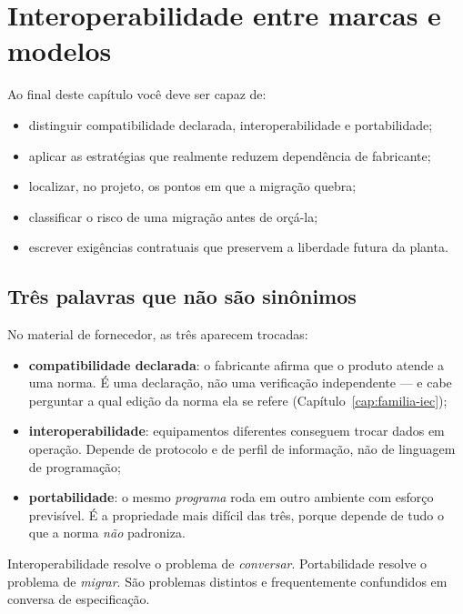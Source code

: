 \chapter{Interoperabilidade entre marcas e modelos}
\label{cap:interoperabilidade}

\begin{objetivos}
Ao final deste capítulo você deve ser capaz de:
\begin{itemize}
  \item distinguir compatibilidade declarada, interoperabilidade e portabilidade;
  \item aplicar as estratégias que realmente reduzem dependência de fabricante;
  \item localizar, no projeto, os pontos em que a migração quebra;
  \item classificar o risco de uma migração antes de orçá-la;
  \item escrever exigências contratuais que preservem a liberdade futura da planta.
\end{itemize}
\end{objetivos}

\section{Três palavras que não são sinônimos}

No material de fornecedor, as três aparecem trocadas:

\begin{itemize}
  \item \textbf{compatibilidade declarada}: o fabricante afirma que o produto atende a uma norma. É
        uma declaração, não uma verificação independente --- e cabe perguntar a qual edição da norma
        ela se refere (Capítulo~\ref{cap:familia-iec});
  \item \textbf{interoperabilidade}: equipamentos diferentes conseguem trocar dados em operação.
        Depende de protocolo e de perfil de informação, não de linguagem de programação;
  \item \textbf{portabilidade}: o mesmo \emph{programa} roda em outro ambiente com esforço
        previsível. É a propriedade mais difícil das três, porque depende de tudo o que a norma
        \emph{não} padroniza.
\end{itemize}

Interoperabilidade resolve o problema de \emph{conversar}. Portabilidade resolve o problema de
\emph{migrar}. São problemas distintos e frequentemente confundidos em conversa de especificação.

